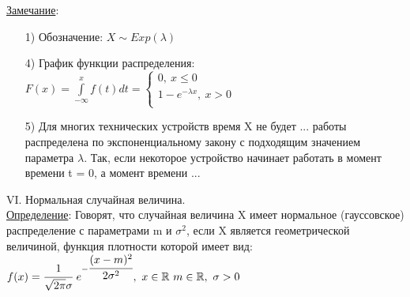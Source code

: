\underline{Замечание}:
\begin{enumerate}
\item[1)] Обозначение: $X \sim Exp(\lambda)$ 

\item[4)] График функции распределения: \\
$F(x) = \int\limits_{-\infty}^{x} f(t) dt = 
\begin{cases}
	0, \ x \leqslant 0 \\
	1 - e^{-\lambda x} , \ x > 0 \\
\end{cases}$

\item[5)] Для многих технических устройств время X не будет ... работы распределена по экспоненциальному закону с подходящим значением параметра $\lambda$. Так, если некоторое устройство начинает работать в момент времени t = 0, а момент времени ...
\end{enumerate}


VI. Нормальная случайная величина. \\
\underline{Определение}: Говорят, что случайная величина X имеет нормальное (гауссовское) распределение с параметрами m и $\sigma^2$, если X является геометрической величиной, функция плотности которой имеет вид: \\
$f(x) = \cfrac{1}{\sqrt{2\pi} \sigma}\  e^{- \cfrac{(x-m)^2}{2\sigma^2}}, \ x \in \mathbb{R} \ m \in \mathbb{R}, \ \sigma > 0$

